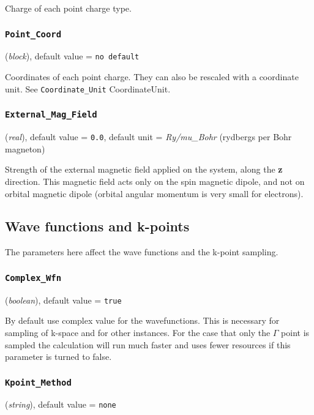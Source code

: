 \documentclass{article}
\begin{document}
Charge of each point charge type.

\subsubsection{\tt Point\_Coord 
\label{PointCoord}}
({\it block}),
default value = {\tt no default}

Coordinates of each point charge. They can also be rescaled with a
coordinate unit. See {\tt Coordinate\_Unit} {CoordinateUnit}.

\subsubsection{\tt External\_Mag\_Field 
\label{ExternalMagField}}
({\it real}),
default value = {\tt 0.0},
default unit = {\it Ry/mu\_Bohr} (rydbergs per Bohr magneton)

Strength of the external magnetic field applied on the system, along
the {\bf z} direction. This magnetic field acts only on the spin magnetic
dipole, and not on orbital magnetic dipole (orbital angular momentum
is very small for electrons).









\subsection{Wave functions and k-points}

The parameters here affect the wave functions and the k-point
sampling.

\subsubsection{\tt Complex\_Wfn 
\label{ComplexWfn}}
({\it boolean}),
default value = {\tt true}

By default use complex value for the wavefunctions.  This is necessary
for sampling of k-space and for other instances.  For the case that 
only the $\Gamma$ point is sampled the calculation will run much
faster and uses fewer resources if this parameter is turned to false.

\subsubsection{\tt Kpoint\_Method 
\label{KpointMethod}}
({\it string}),
default value = {\tt none }
\end{document}
